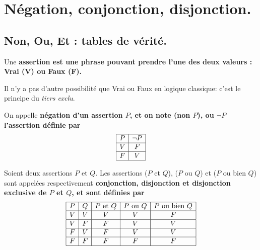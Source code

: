 \documentclass[11pt]{article}
\begin{document}


\thispagestyle{fancy}

\vspace*{-0.8cm}

\section{Négation, conjonction, disjonction.}

\vspace*{-0.3cm}

\subsection{Non, Ou, Et : tables de vérité.}

\begin{defi}{}{}
    Une \bf{assertion} est une phrase pouvant prendre l'une des deux valeurs : Vrai (V) ou Faux (F).
\end{defi}

\vspace*{-0.9cm}

Il n'y a pas d'autre possibilité que Vrai ou Faux en logique classique: c'est le principe du \emph{tiers exclu}.

\begin{defi}{}{}
    On appelle \bf{négation} d'un assertion $P$, et on note (non $P$), ou $\lnot P$ l'assertion définie par
    \begin{equation*}
        \begin{array}{|c|c|}
            \hline
            P&\lnot P\\
            \hline
            V&F\\
            \hline
            F&V\\
            \hline
        \end{array}
    \end{equation*}
\end{defi}

\vspace*{-0.9cm}

\begin{defi}{}{}
    Soient deux assertions $P$ et $Q$. Les assertions ($P$ et $Q$), ($P$ ou $Q$) et ($P$ ou bien $Q$) sont appelées respectivement \bf{conjonction}, \bf{disjonction} et disjonction exclusive de $P$ et $Q$, et sont définies par
    \begin{equation*}
        \begin{array}{|c|c|c|c|c|}
            \hline
            P&Q&P$ et $Q&P$ ou $Q&P$ ou bien $Q\\
            \hline
            V&V&V&V&F\\
            \hline
            V&F&F&V&V\\
            \hline
            F&V&F&V&V\\
            \hline
            F&F&F&F&F\\
            \hline
        \end{array}
    \end{equation*}
\end{defi}
\end{document}
